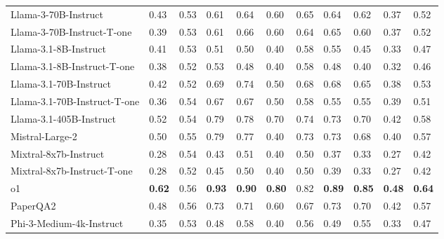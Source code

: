 \begin{tabular}{lllllllllll}
Llama-3-70B-Instruct & 0.43 & 0.53 & 0.61 & 0.64 & 0.60 & 0.65 & 0.64 & 0.62 & 0.37 & 0.52 \\
Llama-3-70B-Instruct-T-one & 0.39 & 0.53 & 0.61 & 0.66 & 0.60 & 0.64 & 0.65 & 0.60 & 0.37 & 0.52 \\
Llama-3.1-8B-Instruct & 0.41 & 0.53 & 0.51 & 0.50 & 0.40 & 0.58 & 0.55 & 0.45 & 0.33 & 0.47 \\
Llama-3.1-8B-Instruct-T-one & 0.38 & 0.52 & 0.53 & 0.48 & 0.40 & 0.58 & 0.48 & 0.40 & 0.32 & 0.46 \\
Llama-3.1-70B-Instruct & 0.42 & 0.52 & 0.69 & 0.74 & 0.50 & 0.68 & 0.68 & 0.65 & 0.38 & 0.53 \\
Llama-3.1-70B-Instruct-T-one & 0.36 & 0.54 & 0.67 & 0.67 & 0.50 & 0.58 & 0.55 & 0.55 & 0.39 & 0.51 \\
Llama-3.1-405B-Instruct & 0.52 & 0.54 & 0.79 & 0.78 & 0.70 & 0.74 & 0.73 & 0.70 & 0.42 & 0.58 \\
Mistral-Large-2 & 0.50 & 0.55 & 0.79 & 0.77 & 0.40 & 0.73 & 0.73 & 0.68 & 0.40 & 0.57 \\
Mixtral-8x7b-Instruct & 0.28 & 0.54 & 0.43 & 0.51 & 0.40 & 0.50 & 0.37 & 0.33 & 0.27 & 0.42 \\
Mixtral-8x7b-Instruct-T-one & 0.28 & 0.52 & 0.45 & 0.50 & 0.40 & 0.50 & 0.39 & 0.33 & 0.27 & 0.42 \\
o1 & \textbf{0.62} & 0.56 & \textbf{0.93} & \textbf{0.90} & \textbf{0.80} & 0.82 & \textbf{0.89} & \textbf{0.85} & \textbf{0.48} & \textbf{0.64} \\
PaperQA2 & 0.48 & 0.56 & 0.73 & 0.71 & 0.60 & 0.67 & 0.73 & 0.70 & 0.42 & 0.57 \\
Phi-3-Medium-4k-Instruct & 0.35 & 0.53 & 0.48 & 0.58 & 0.40 & 0.56 & 0.49 & 0.55 & 0.33 & 0.47 \\
\bottomrule
\end{tabular}

